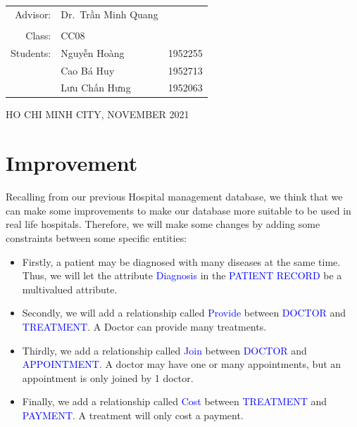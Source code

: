 \documentclass[a4paper]{article}
\numberwithin{equation}{section}
\begin{document}
\begin{titlepage}
  \begin{table}[h]
    \begin{tabular}{rll}
      \hspace{5cm} Advisor:  & Dr.\ Trần Minh Quang           \\
                             &                                \\
      \hspace{5cm} Class:    & CC08                           \\
      \hspace{5cm} Students: & Nguyễn Hoàng         & 1952255 \\
                             & Cao Bá Huy           & 1952713 \\
                             & Lưu Chấn Hưng        & 1952063
    \end{tabular}
  \end{table}

  \begin{center}
    {\footnotesize \large HO CHI MINH CITY, NOVEMBER 2021}
  \end{center}
\end{titlepage}


\newpage
\tableofcontents
\newpage

\section{Improvement}
Recalling from our previous Hospital management database, we think that we can make some improvements to make our database more suitable to be used in real life hospitals. Therefore, we will make some changes by adding some constraints between some specific entities:

\begin{itemize}
  \item Firstly, a patient may be diagnosed with many diseases at the same time. Thus, we will let the attribute \textcolor{blue}{Diagnosis} in the \textcolor{blue}{PATIENT RECORD} be a multivalued attribute.
  \item Secondly, we will add a relationship called \textcolor{blue}{Provide} between \textcolor{blue}{DOCTOR} and \textcolor{blue}{TREATMENT}\@. A Doctor can provide many treatments.

  \item Thirdly, we add a relationship called \textcolor{blue}{Join} between \textcolor{blue}{DOCTOR} and \textcolor{blue}{APPOINTMENT}\@. A doctor may have one or many appointments, but an appointment is only joined by 1 doctor.
  \item Finally,  we add a relationship called \textcolor{blue}{Cost} between \textcolor{blue}{TREATMENT} and \textcolor{blue}{PAYMENT}\@. A treatment will only cost a payment.

\end{itemize}
\end{document}
